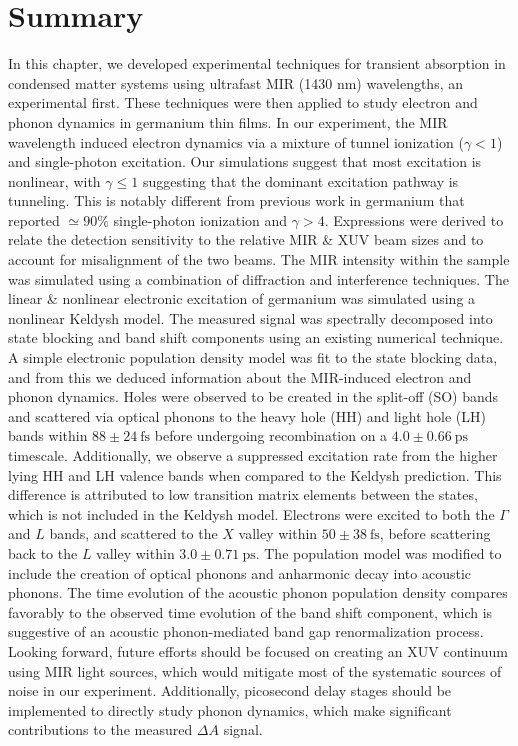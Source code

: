 \section{Summary}


In this chapter, we developed experimental techniques for transient absorption in condensed matter systems using ultrafast MIR (1430 nm) wavelengths, an experimental first. These techniques were then applied to study electron and phonon dynamics in germanium thin films. In our experiment, the MIR wavelength induced electron dynamics via a mixture of tunnel ionization ($\gamma < 1$) and single-photon excitation. Our simulations suggest that most excitation is nonlinear, with $\gamma \le 1$ suggesting that the dominant excitation pathway is tunneling. This is notably different from previous work in germanium that reported $\simeq 90\%$ single-photon ionization and $\gamma > 4$. Expressions were derived to relate the detection sensitivity to the relative MIR \& XUV beam sizes and to account for misalignment of the two beams. The MIR intensity within the sample was simulated using a combination of diffraction and interference techniques. The linear \& nonlinear electronic excitation of germanium was simulated using a nonlinear Keldysh model. The measured signal was spectrally decomposed into state blocking and band shift components using an existing numerical technique. A simple electronic population density model was fit to the state blocking data, and from this we deduced information about the MIR-induced electron and phonon dynamics. Holes were observed to be created in the split-off (SO) bands and scattered via optical phonons to the heavy hole (HH) and light hole (LH) bands within $88 \pm 24 \ \textrm{fs}$ before undergoing recombination on a $4.0 \pm 0.66 \ \textrm{ps}$ timescale. Additionally, we observe a suppressed excitation rate from the higher lying HH and LH valence bands when compared to the Keldysh prediction. This difference is attributed to low transition matrix elements between the states, which is not included in the Keldysh model. Electrons were excited to both the $\Gamma$ and $L$ bands, and scattered to the $X$ valley within $50 \pm 38 \ \textrm{fs}$, before scattering back to the $L$ valley within $3.0 \pm 0.71 \ \textrm{ps}$. The population model was modified to include the creation of optical phonons and anharmonic decay into acoustic phonons. The time evolution of the acoustic phonon population density compares favorably to the observed time evolution of the band shift component, which is suggestive of an acoustic phonon-mediated band gap renormalization process. Looking forward, future efforts should be focused on creating an XUV continuum using MIR light sources, which would mitigate most of the systematic sources of noise in our experiment. Additionally, picosecond delay stages should be implemented to directly study phonon dynamics, which make significant contributions to the measured $\Delta A$ signal.
